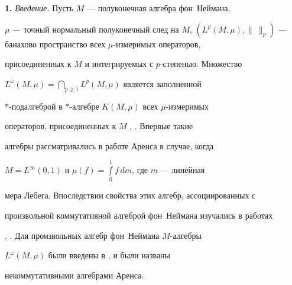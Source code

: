  


\date{} 




 


\pagestyle{plain} %


 


 




 


\maketitle 


\label{begin} 


 


{\bf 1.} {\it Введение.} Пусть $M$ --- полуконечная алгебра фон~Неймана, 


$\mu$ --- точный нормальный полуконечный след на $M$, $(L^p(M,\mu),\|\ 


\|_p)$ --- банахово пространство всех $\mu$-измеримых операторов, 


присоединенных к $M$ и интегрируемых с $p$-степенью. Множество 


$L^\omega(M,\mu)=\bigcap\limits_{p\ge 1}L^p(M,\mu)$ является заполненной 


$*$-подалгеброй в $*$-алгебре $K(M,\mu)$ всех $\mu$-измеримых 


операторов, присоединенных к $M$ \cite{1}, \cite{2}. Впервые такие 


алгебры рассматривались в работе Аренса \cite{3} в случае, когда 


$M=L^\infty(0,1)$ и $\mu(f)=\int\limits^1_0 f\,dm$, где $m$ --- линейная 


мера Лебега. Впоследствии свойства этих алгебр, ассоциированных с 


произвольной коммутативной алгеброй фон~Неймана изучались в работах 


\cite{4}, \cite{5}. Для произвольных алгебр фон~Неймана $M$-алгебры 


$L^\omega(M,\mu)$ были введены в \cite{1}, \cite{2} и были названы 


некоммутативными алгебрами Аренса. 


 


